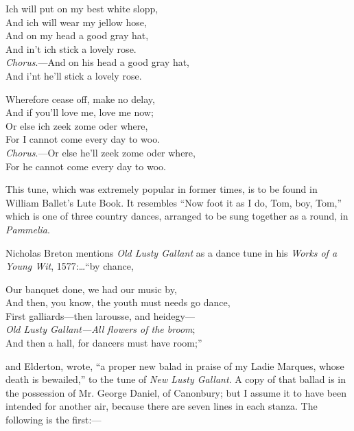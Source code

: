 \begin{dcverse}
\begin{patverse}
\vin Ich will put on my best white slopp,\\
And ich will wear my jellow hose,\\
And on my head a good gray hat,\\
And in’t ich stick a lovely rose.\\
\textit{Chorus}.—And on his head a good gray hat,\\
And i'nt he'll stick a lovely rose.
\end{patverse}

\begin{patverse}
\vin Wherefore cease off, make no delay,\\
And if you’ll love me, love me now;\\
Or else ich zeek zome oder where,\\
For I cannot come every day to woo.\\
\textit{Chorus}.—Or else he'll zeek zome oder where,\\
For he cannot come every day to woo.
\end{patverse}
\end{dcverse}



\pagebreak


This tune, which was extremely popular in former times, is to be found in
William Ballet’s Lute Book. It resembles “Now foot it as I do, Tom, boy, Tom,”
which is one of three country dances, arranged to be sung together as a round, in
\textit{Pammelia}.

Nicholas Breton mentions \textit{Old Lusty Gallant} as a dance tune in his \textit{Works of
a Young Wit}, 1577:\qquad \qquad \qquad\dots “by chance,
\begin{scverse}
Our banquet done, we had our music by,\\
And then, you know, the youth must needs go dance,\\
First galliards—then larousse, and heidegy—\\
\textit{Old Lusty Gallant—All flowers of the broom};\\
And then a hall, for dancers must have room;”
\end{scverse}
and Elderton, wrote, “a proper new balad in praise of my Ladie Marques, whose
death is bewailed,” to the tune of \textit{New Lusty Gallant}. A copy of that ballad is
in the possession of Mr. George Daniel, of Canonbury; but I assume it to have
been intended for another air, because there are seven lines in each stanza. The
following is the first:—

